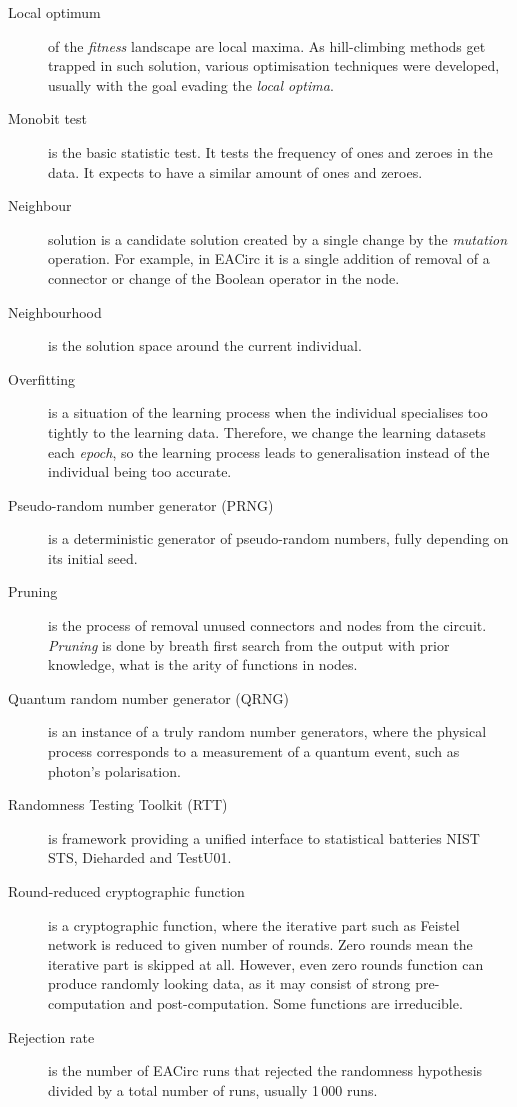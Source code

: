 \documentclass[
    digital,    %
    oneside,    %
    color,
    11pt,
    nocover,
    notable,
    nolof,
    nolot,
]{fithesis3}
\begin{document}
\begin{description}
    \item[Local optimum] of the \textit{fitness} landscape are local maxima. As hill-climbing methods get trapped in such solution, various optimisation techniques were developed, usually with the goal evading the \textit{local optima}.
    \item[Monobit test] is the basic statistic test. It tests the frequency of ones and zeroes in the data. It expects to have a similar amount of ones and zeroes.
    \item[Neighbour] solution is a candidate solution created by a single change by the \textit{mutation} operation. For example, in EACirc it is a single addition of removal of a connector or change of the Boolean operator in the node.
    \item[Neighbourhood] is the solution space around the current individual.
    \item[Overfitting] is a situation of the learning process when the individual specialises too tightly to the learning data. Therefore, we change the learning datasets each \textit{epoch}, so the learning process leads to generalisation instead of the individual being too accurate.
    \item[Pseudo-random number generator (PRNG)] is a deterministic generator of pseudo-random numbers, fully depending on its initial seed.
    \item[Pruning] is the process of removal unused connectors and nodes from the circuit. \textit{Pruning} is done by breath first search from the output with prior knowledge, what is the arity of functions in nodes.
    \item[Quantum random number generator (QRNG)] is an instance of a truly random number generators, where the physical process corresponds to a measurement of a quantum event, such as photon's polarisation.
    \item[Randomness Testing Toolkit (RTT)] is framework providing a unified interface to statistical batteries NIST STS, Dieharded and TestU01.
    \item[Round-reduced cryptographic function] is a cryptographic function, where the iterative part such as Feistel network is reduced to given number of rounds. Zero rounds mean the iterative part is skipped at all. However, even zero rounds function can produce randomly looking data, as it may consist of strong pre-computation and post-computation. Some functions are irreducible.
    \item[Rejection rate] is the number of EACirc runs that rejected the randomness hypothesis divided by a total number of runs, usually 1\,000 runs.

\end{description}
\end{document}
